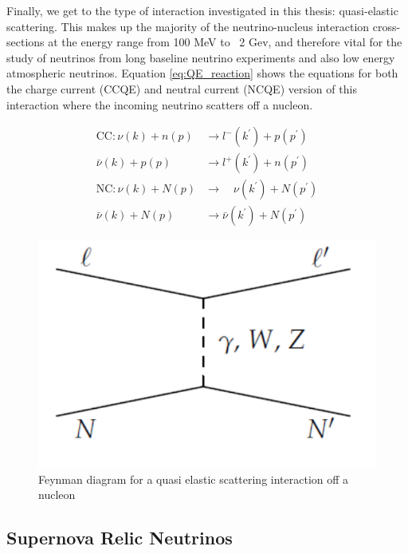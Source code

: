 Finally, we get to the type of interaction investigated in this thesis: quasi-elastic scattering. This makes up the majority of the neutrino-nucleus interaction cross-sections at the energy range from 100 MeV to ~2 Gev, and therefore vital for the study of neutrinos from long baseline neutrino experiments and also low energy atmospheric neutrinos. Equation \ref{eq:QE_reaction} shows the equations for both the charge current (CCQE) and neutral current (NCQE) version of this interaction where the incoming neutrino scatters off a nucleon.

$$
\begin{aligned}
\mathrm{CC}: \nu(k)+n(p) & \rightarrow l^{-}\left(k^{\prime}\right)+p\left(p^{\prime}\right) \\
\bar{\nu}(k)+p(p) & \rightarrow l^{+}\left(k^{\prime}\right)+n\left(p^{\prime}\right) \\
\mathrm{NC}: \nu(k)+N(p) & \rightarrow \quad \nu\left(k^{\prime}\right)+N\left(p^{\prime}\right) \\
\bar{\nu}(k)+N(p) & \rightarrow \bar{\nu}\left(k^{\prime}\right)+N\left(p^{\prime}\right)
\end{aligned}
\label{eq:QE_reaction}
$$

\begin{figure}
    \includegraphics[width=\textwidth]{Figures/QE_feynman.png}
    \caption{Feynman diagram for a quasi elastic scattering interaction off a nucleon}
    \label{fig:QE_reaction}
\end{figure}


\subsection{Supernova Relic Neutrinos}

